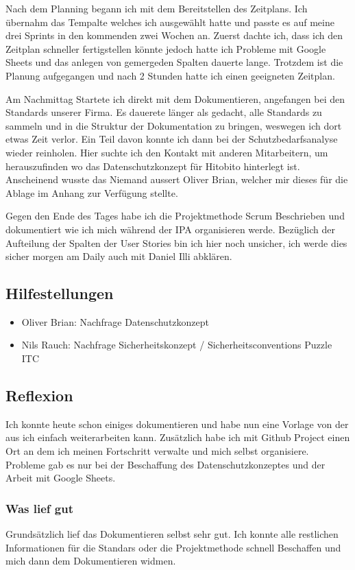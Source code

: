 Nach dem Planning begann ich mit dem Bereitstellen des Zeitplans. Ich übernahm das Tempalte welches ich ausgewählt hatte und
passte es auf meine drei Sprints in den kommenden zwei Wochen an. Zuerst dachte ich, dass ich den Zeitplan schneller fertigstellen könnte
jedoch hatte ich Probleme mit Google Sheets und das anlegen von gemergeden Spalten dauerte lange. Trotzdem ist die Planung aufgegangen und nach 2 Stunden
hatte ich einen geeigneten Zeitplan. 

Am Nachmittag Startete ich direkt mit dem Dokumentieren, angefangen bei den Standards unserer Firma. Es dauerete länger als gedacht,
alle Standards zu sammeln und in die Struktur der Dokumentation zu bringen, weswegen ich dort etwas Zeit verlor. Ein Teil davon konnte ich dann
bei der Schutzbedarfsanalyse wieder reinholen. Hier suchte ich den Kontakt mit anderen Mitarbeitern, um herauszufinden wo das Datenschutzkonzept für
Hitobito hinterlegt ist. Anscheinend wusste das Niemand aussert Oliver Brian, welcher mir dieses für die Ablage im Anhang zur Verfügung stellte.

Gegen den Ende des Tages habe ich die Projektmethode Scrum Beschrieben und dokumentiert wie ich mich während der IPA organisieren werde. 
Bezüglich der Aufteilung der Spalten der User Stories bin ich hier noch unsicher, ich werde dies sicher morgen am Daily auch mit
Daniel Illi abklären.

\subsection*{Hilfestellungen}
\begin{itemize}
    \item Oliver Brian: Nachfrage Datenschutzkonzept
    \item Nils Rauch: Nachfrage Sicherheitskonzept / Sicherheitsconventions Puzzle ITC
\end{itemize}

\subsection*{Reflexion}
Ich konnte heute schon einiges dokumentieren und habe nun eine Vorlage von der aus ich
einfach weiterarbeiten kann. Zusätzlich habe ich mit Github Project einen Ort an dem ich meinen
Fortschritt verwalte und mich selbst organisiere. Probleme gab es nur bei der Beschaffung des Datenschutzkonzeptes
und der Arbeit mit Google Sheets.

\subsubsection*{Was lief gut}
Grundsätzlich lief das Dokumentieren selbst sehr gut. Ich konnte alle restlichen Informationen
für die Standars oder die Projektmethode schnell Beschaffen und mich dann dem Dokumentieren widmen. 

